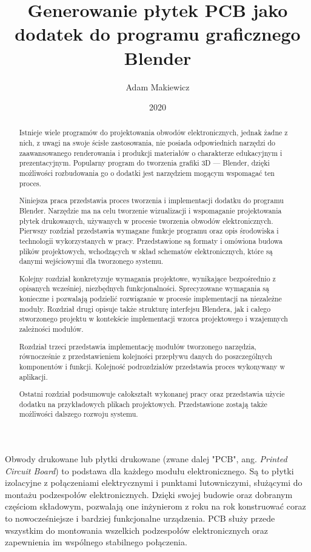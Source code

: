\documentclass{xmgr}
\author   {Adam Makiewicz}
\title    {Generowanie płytek PCB jako dodatek do programu graficznego Blender}
\date     {2020}
\begin{document}
\begin{abstract}

Istnieje wiele programów do projektowania obwodów elektronicznych, jednak żadne z nich, z uwagi na swoje ścisłe zastosowania, nie posiada odpowiednich narzędzi do zaawansowanego renderowania i produkcji materiałów o charakterze edukacyjnym i prezentacyjnym. Popularny program do tworzenia grafiki 3D --- Blender, dzięki możliwości rozbudowania go o dodatki jest narzędziem mogącym wspomagać ten proces.

Niniejsza praca przedstawia proces tworzenia i implementacji dodatku do programu Blender. Narzędzie ma na celu tworzenie wizualizacji i wspomaganie projektowania płytek drukowanych, używanych w procesie tworzenia obwodów elektronicznych. Pierwszy rozdział przedstawia wymagane funkcje programu oraz opis środowiska i technologii wykorzystanych w pracy. Przedstawione są formaty i omówiona budowa plików projektowych, wchodzących w skład schematów elektronicznych, które są danymi wejściowymi dla tworzonego systemu.

Kolejny rozdział konkretyzuje wymagania projektowe, wynikające bezpośrednio z opisanych wcześniej, niezbędnych funkcjonalności. Sprecyzowane wymagania są konieczne i pozwalają podzielić rozwiązanie w procesie implementacji na niezależne moduły. Rozdział drugi opisuje także strukturę interfejsu Blendera, jak i całego stworzonego projektu w kontekście implementacji wzorca projektowego i wzajemnych zależności modułów.

Rozdział trzeci przedstawia implementację modułów tworzonego narzędzia, równocześnie z przedstawieniem kolejności przepływu danych do poszczególnych komponentów i funkcji. Kolejność podrozdziałów przedstawia proces wykonywany w aplikacji.

Ostatni rozdział podsumowuje całokształt wykonanej pracy oraz przedstawia użycie dodatku na przykładowych plikach projektowych. Przedstawione zostają także możliwości dalszego rozwoju systemu.
\end{abstract}



\maketitle

\introduction

Obwody drukowane lub płytki drukowane (zwane dalej "PCB", ang. \emph{Printed Circuit Board}) to podstawa dla każdego modułu elektronicznego. Są to płytki izolacyjne z połączeniami elektrycznymi i punktami lutowniczymi, służącymi do montażu podzespołów elektronicznych. Dzięki swojej budowie oraz dobranym częściom składowym, pozwalają one inżynierom z roku na rok konstruować coraz to nowocześniejsze i bardziej funkcjonalne urządzenia. PCB służy przede wszystkim do montowania wszelkich podzespołów elektronicznych oraz zapewnienia im wspólnego stabilnego połączenia.
\end{document}
